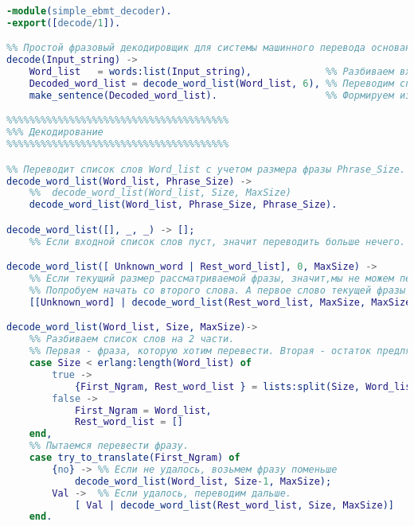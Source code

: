 


{ \footnotesize
\begin{lstlisting}[language=erlang]
-module(simple_ebmt_decoder).
-export([decode/1]).

%% Простой фразовый декодировщик для системы машинного перевода основанной на примерах
decode(Input_string) ->
    Word_list   = words:list(Input_string),             %% Разбиваем входную строку на слова.
    Decoded_word_list = decode_word_list(Word_list, 6), %% Переводим список слов.
    make_sentence(Decoded_word_list).                   %% Формируем из него предложение.

%%%%%%%%%%%%%%%%%%%%%%%%%%%%%%%%%%%%%%%
%%% Декодирование
%%%%%%%%%%%%%%%%%%%%%%%%%%%%%%%%%%%%%%%

%% Переводит список слов Word_list с учетом размера фразы Phrase_Size.
decode_word_list(Word_list, Phrase_Size) ->
    %%  decode_word_list(Word_list, Size, MaxSize)
    decode_word_list(Word_list, Phrase_Size, Phrase_Size).

decode_word_list([], _, _) -> [];
    %% Если входной список слов пуст, значит переводить больше нечего.

decode_word_list([ Unknown_word | Rest_word_list], 0, MaxSize) ->
    %% Если текущий размер рассматриваемой фразы, значит,мы не можем перевести эту фразу с начала.
    %% Попробуем начать со второго слова. А первое слово текущей фразы признаем неизвестным.
    [[Unknown_word] | decode_word_list(Rest_word_list, MaxSize, MaxSize)];

decode_word_list(Word_list, Size, MaxSize)->
    %% Разбиваем список слов на 2 части.
    %% Первая - фраза, которую хотим перевести. Вторая - остаток предляжения.
    case Size < erlang:length(Word_list) of
        true ->
            {First_Ngram, Rest_word_list } = lists:split(Size, Word_list);
        false ->
            First_Ngram = Word_list,
            Rest_word_list = []
    end,
    %% Пытаемcя перевести фразу.
    case try_to_translate(First_Ngram) of
        {no} -> %% Если не удалось, возьмем фразу поменьше
            decode_word_list(Word_list, Size-1, MaxSize);
        Val ->  %% Если удалось, переводим дальше.
            [ Val | decode_word_list(Rest_word_list, Size, MaxSize)]
    end.


\end{lstlisting}}
